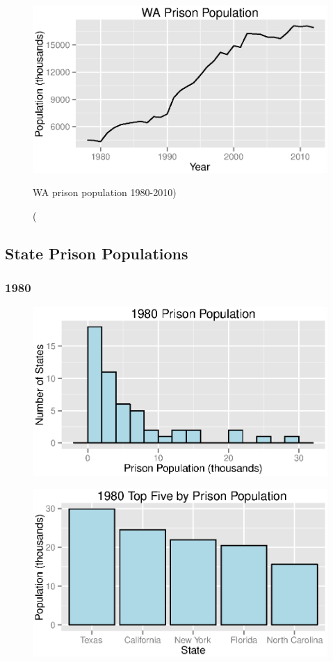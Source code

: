 \documentclass{exam}
\begin{document}
  \begin{figure}[H]
    \centering
    \includegraphics[scale = 0.9]{figures/wa_prison_population.eps}
    \caption(WA prison population 1980-2010)
  \end{figure}

  \subsection{State Prison Populations}
  \subsubsection{1980}
  \begin{figure}[H]
    \centering
    \includegraphics[scale = 0.9]{1980_pp_histogram.eps}
  \end{figure}

  \begin{figure}[H]
    \centering
    \includegraphics[scale = 0.9]{top_five_1980.eps}
  \end{figure}
\end{document}

